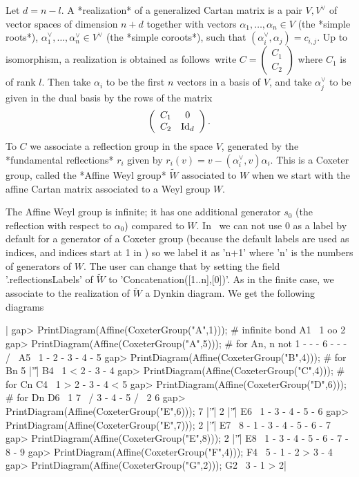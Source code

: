 Let  $d=n-l$.  A  *realization*  of  a  generalized Cartan matrix is a pair
$V,V^\vee$  of  vector  spaces  of  dimension  $n+d$  together with vectors
$\alpha_1,\ldots,\alpha_n\in V$ (the *simple roots*),
$\alpha^\vee_1,\ldots,\alpha^\vee_n\in V^\vee$ (the *simple coroots*), such
that  $(\alpha^\vee_i, \alpha_j)=c_{i,j}$. Up to isomorphism, a realization
is obtained as follows\:\ write $C=\left(
\begin{array}{c}C_1\\C_2\end{array}\right)$  where  $C_1$  is  of rank $l$.
Then  take $\alpha_i$ to  be the first  $n$ vectors in  a basis of $V$, and
take  $\alpha^\vee_j$ to  be given  in the  dual basis  by the  rows of the
matrix $$\left(\begin{array}{cc}C_1&0\\ C_2&\hbox{Id}_d\\
\end{array}\right).$$  To $C$ we associate a  reflection group in the space
$V$,   generated   by   the   *fundamental   reflections*  $r_i$  given  by
$r_i(v)=v-(\alpha^\vee_i,v)\alpha_i$.  This is a  Coxeter group, called the
*Affine  Weyl group* $\tilde  W$ associated to  $W$ when we  start with the
affine Cartan matrix associated to a Weyl group $W$.

The  Affine Weyl group  is infinite; it  has one additional generator $s_0$
(the  reflection with respect  to $\alpha_0$) compared  to $W$. In \GAP\ we
can  not use $0$ as a  label by default for a  generator of a Coxeter group
(because  the default labels are used as indices, and indices start at 1 in
\GAP)  so we label  it as 'n+1'  where 'n' is  the numbers of generators of
$W$.  The user can change that by setting the field '.reflectionsLabels' of
$\tilde  W$  to  'Concatenation([1..n],[0])'.  As  in  the  finite case, we
associate  to the realization  of $\tilde W$  a Dynkin diagram.  We get the
following diagrams\:

|    gap> PrintDiagram(Affine(CoxeterGroup("A",1))); # infinite bond
    A1~  1 oo 2
    gap> PrintDiagram(Affine(CoxeterGroup("A",5)));  # for An, n not 1
            - - - 6 - - -
           /             \
    A5~   1 - 2 - 3 - 4 - 5
    gap> PrintDiagram(Affine(CoxeterGroup("B",4)));  # for Bn
                  5
                  |'\|'|
    B4~   1 < 2 - 3 - 4
    gap> PrintDiagram(Affine(CoxeterGroup("C",4)));  # for Cn
    C4~   1 > 2 - 3 - 4 < 5
    gap> PrintDiagram(Affine(CoxeterGroup("D",6)));  # for Dn
    D6~  1           7
          \         /
           3 - 4 - 5
          /         \
         2           6
    gap> PrintDiagram(Affine(CoxeterGroup("E",6)));
                 7
                 |'\|'|
                 2
                 |'\|'|
    E6~  1 - 3 - 4 - 5 - 6
    gap> PrintDiagram(Affine(CoxeterGroup("E",7)));
                     2
                     |'\|'|
    E7~  8 - 1 - 3 - 4 - 5 - 6 - 7
    gap> PrintDiagram(Affine(CoxeterGroup("E",8)));
                 2
                 |'\|'|
    E8~  1 - 3 - 4 - 5 - 6 - 7 - 8 - 9
    gap> PrintDiagram(Affine(CoxeterGroup("F",4)));
    F4~  5 - 1 - 2 > 3 - 4
    gap> PrintDiagram(Affine(CoxeterGroup("G",2)));
    G2~  3 - 1 > 2|

